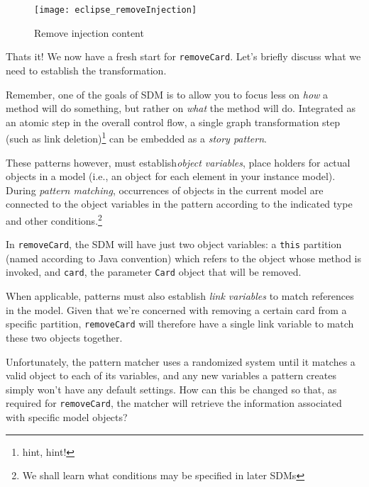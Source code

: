 \begin{figure}[htbp]
	\centering
    \texttt{[image: eclipse\_removeInjection]}
	\caption{Remove injection content}
	\label{fig:delete_injection}
\end{figure}

\vspace{1cm}

Thats it! We now have a fresh start for \texttt{removeCard}. Let's briefly discuss what we need to establish the transformation.

Remember, one of the goals of SDM is to allow you to focus less on \emph{how} a method will do something, but rather on \emph{what} the method will do.
Integrated as an atomic step in the overall control flow, a single graph transformation step (such as link deletion)\footnote{hint, hint!} can be embedded as a
\emph{story pattern}.

These patterns however, must establish\emph{object variables}, place holders for actual objects in a model (i.e., an object for
each element in your instance model). During \emph{pattern matching}, occurrences of objects in the current model are connected to the object variables in the
pattern according to the indicated type and other conditions.\footnote{We shall learn what conditions may be specified in later SDMs}

\clearpage

In \texttt{removeCard}, the SDM will have just two object variables: a \texttt{this} partition (named according to Java convention) which refers to the
object whose method is invoked, and \texttt{card}, the parameter \texttt{Card} object that will be removed.

When applicable, patterns must also establish \emph{link variables} to match references in the model. Given that
we're concerned with removing a certain card from a specific partition, \texttt{removeCard} will therefore have a single link variable to match these two
objects together.

Unfortunately, the pattern matcher uses a randomized system until it matches a valid object to each of its variables, and any new variables a pattern
creates simply won't have any default settings. How can this be changed so that, as required for \texttt{removeCard}, the matcher will retrieve the information
associated with specific model objects?

